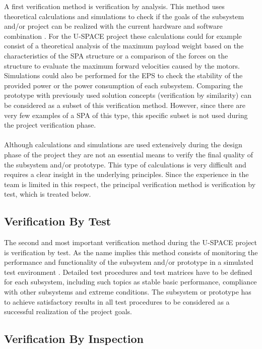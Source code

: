 A first verification method is verification by analysis. This method uses theoretical calculations and simulations to check if the goals of the subsystem and/or project can be realized with the current hardware and software combination \cite{ECSS_verification}. For the \ac{U-SPACE} project these calculations could for example consist of a theoretical analysis of the maximum payload weight based on the characteristics of the \ac{SPA} structure or a comparison of the forces on the structure to evaluate the maximum forward velocities caused by the motors. Simulations could also be performed for the \ac{EPS} to check the stability of the provided power or the power consumption of each subsystem. Comparing the prototype with previously used solution concepts (verification by similarity) can be considered as a subset of this verification method. However, since there are very few examples of a \ac{SPA} of this type, this specific subset is not used during the project verification phase.
\\
\\
Although calculations and simulations are used extensively during the design phase of the project they are not an essential means to verify the final quality of the subsystem and/or prototype. This type of calculations is very difficult and requires a clear insight in the underlying principles. Since the experience in the team is limited in this respect, the principal verification method is verification by test, which is treated below.

\subsection{Verification By Test}

The second and most important verification method during the \ac{U-SPACE} project is verification by test. As the name implies this method consists of monitoring the performance and functionality of the subsystem and/or prototype in a simulated test environment \cite{ECSS_verification}. Detailed test procedures and test matrices have to be defined for each subsystem, including such topics as stable basic performance, compliance with other subsystems and extreme conditions. The subsystem or prototype has to achieve satisfactory results in all test procedures to be considered as a successful realization of the project goals.

\subsection{Verification By Inspection}

